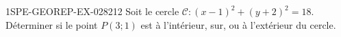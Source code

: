\begin{exercice}{1SPE-GEOREP-EX-028}{2}{12}
Soit le cercle $\mathcal{C} : (x - 1)^2 + (y + 2)^2 = 18$. Déterminer si le point $P(3 ; 1)$ est à l'intérieur, sur, ou à l'extérieur du cercle.
\end{exercice}
